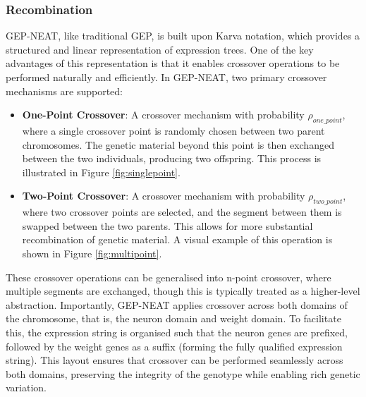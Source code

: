 \subsubsection{Recombination}
GEP-NEAT, like traditional GEP, is built upon Karva notation, which provides a structured and linear representation of expression trees. One of the key advantages of this representation is that it enables crossover operations to be performed naturally and efficiently. In GEP-NEAT, two primary crossover mechanisms are supported:
\begin{itemize}
	\item \textbf{One-Point Crossover}: A crossover mechanism with probability $\rho_{one\_point}$, where a single crossover point is randomly chosen between two parent chromosomes. The genetic material beyond this point is then exchanged between the two individuals, producing two offspring. This process is illustrated in Figure \ref{fig:singlepoint}.
	\item \textbf{Two-Point Crossover}: A crossover mechanism with probability $\rho_{two\_point}$, where two crossover points are selected, and the segment between them is swapped between the two parents. This allows for more substantial recombination of genetic material. A visual example of this operation is shown in Figure \ref{fig:multipoint}.
\end{itemize}

\parbreak\noindent These crossover operations can be generalised into n-point crossover, where multiple segments are exchanged, though this is typically treated as a higher-level abstraction. Importantly, GEP-NEAT applies crossover across both domains of the chromosome, that is, the neuron domain and weight domain. To facilitate this, the expression string is organised such that the neuron genes are prefixed, followed by the weight genes as a suffix (forming the fully qualified expression string). This layout ensures that crossover can be performed seamlessly across both domains, preserving the integrity of the genotype while enabling rich genetic variation.

